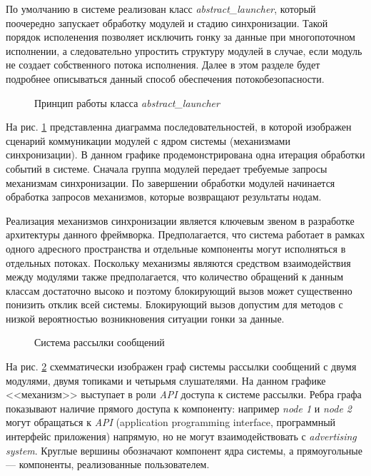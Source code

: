 По умолчанию в системе реализован класс \textit{abstract\_launcher}, который поочередно запускает обработку модулей и стадию синхронизации. Такой порядок исполенения позволяет исключить гонку за данные при многопоточном исполнении, а следовательно упростить структуру модулей в случае, если модуль не создает собственного потока исполнения. Далее в этом разделе будет подробнее описываться данный способ обеспечения потокобезопасности.

\begin{figure}[h]
    \caption{Принцип работы класса \textit{abstract\_launcher}}
    \label{im:2_2_2_sequence_diag}
\end{figure}

На рис. \ref{im:2_2_2_sequence_diag} представленна диаграмма 
последовательностей, в которой изображен сценарий коммуникации модулей с ядром 
системы (механизмами синхронизации). В данном графике продемонстрирована одна 
итерация обработки событий в системе. Сначала группа модулей передает требуемые 
запросы механизмам синхронизации. По завершении обработки модулей начинается 
обработка запросов механизмов, которые возвращают результаты нодам.

Реализация механизмов синхронизации является ключевым звеном в разработке архитектуры данного фреймворка. Предполагается, что система работает в рамках одного адресного пространства и отдельные компоненты могут исполняться в отдельных потоках. Поскольку механизмы являются средством взаимодействия между модулями также предполагается, что количество обращений к данным классам достаточно высоко и поэтому блокирующий вызов может существенно понизить отклик всей системы. Блокирующий вызов допустим для методов с низкой вероятностью возникновения ситуации гонки за данные.

\begin{figure}[h]
    \caption{Система рассылки сообщений}
    \label{im:2_2_3_topic}
\end{figure}

На рис. \ref{im:2_2_3_topic} схемматически изображен граф системы рассылки сообщений с двумя модулями, двумя топиками и четырьмя слушателями. На данном графике <<механизм>> выступает в роли \textit{API} доступа к системе рассылки. Ребра графа показывают наличие прямого доступа к компоненту: например \textit{node 1} и \textit{node 2} могут обращаться к \textit{API} (application programming interface, программный интерфейс приложения) напрямую, но не могут взаимодействовать с \textit{advertising system}. Круглые вершины обозначают компонент ядра системы, а прямоугольные --- компоненты, реализованные пользователем.

